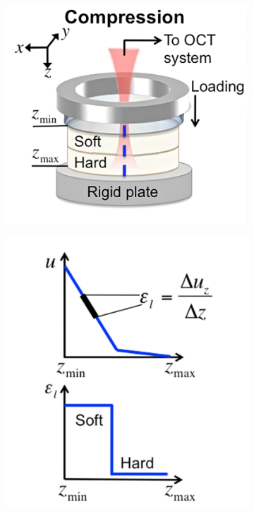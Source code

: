 \begin{figure}
	\centering
	\begin{subfigure}{0.4\textwidth}
    	\centering
        \includegraphics[width=\textwidth]{figures/oce_hardware.png}
    \end{subfigure}
    \begin{subfigure}{0.3\textwidth}
    	\centering
        \includegraphics[width=\textwidth]{figures/ascan_example.png}
    \end{subfigure}
    \label{oce_system}
\end{figure}

